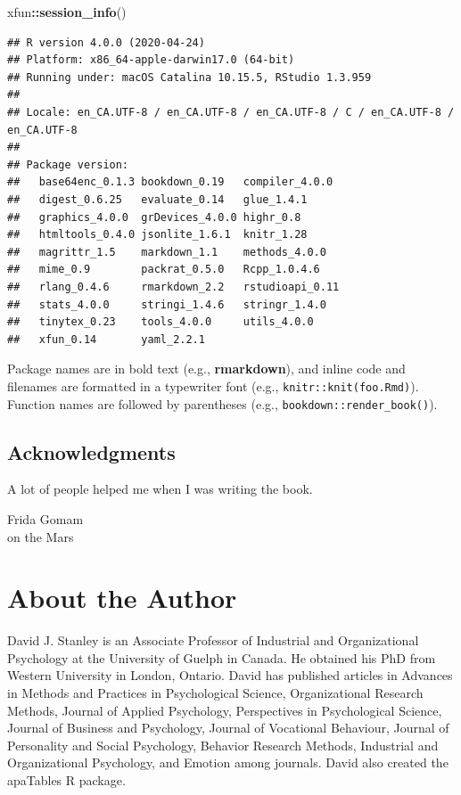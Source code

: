 \documentclass[
]{krantz}
\makeatletter
\newenvironment{Shaded}{\begin{snugshade}}{\end{snugshade}}
\newcommand{\KeywordTok}[1]{\textcolor[rgb]{0.27,0.27,0.27}{\textbf{#1}}}
\newcommand{\NormalTok}[1]{#1}
\newcommand{\OperatorTok}[1]{\textcolor[rgb]{0.43,0.43,0.43}{\textbf{#1}}}
\newenvironment{kframe}{%
\medskip{}
\setlength{\fboxsep}{.8em}
 \def\at@end@of@kframe{}%
 \ifinner\ifhmode%
  \def\at@end@of@kframe{\end{minipage}}%
  \begin{minipage}{\columnwidth}%
 \fi\fi%
 \def\FrameCommand##1{\hskip\@totalleftmargin \hskip-\fboxsep
 \colorbox{shadecolor}{##1}\hskip-\fboxsep
     \hskip-\linewidth \hskip-\@totalleftmargin \hskip\columnwidth}%
 \MakeFramed {\advance\hsize-\width
   \@totalleftmargin\z@ \linewidth\hsize
   \@setminipage}}%
 {\par\unskip\endMakeFramed%
 \at@end@of@kframe}
\renewenvironment{Shaded}{\begin{kframe}}{\end{kframe}}
\makeatother
\begin{document}
\begin{Shaded}
\begin{Highlighting}[]
\NormalTok{xfun}\OperatorTok{::}\KeywordTok{session_info}\NormalTok{()}
\end{Highlighting}
\end{Shaded}

\begin{verbatim}
## R version 4.0.0 (2020-04-24)
## Platform: x86_64-apple-darwin17.0 (64-bit)
## Running under: macOS Catalina 10.15.5, RStudio 1.3.959
## 
## Locale: en_CA.UTF-8 / en_CA.UTF-8 / en_CA.UTF-8 / C / en_CA.UTF-8 / en_CA.UTF-8
## 
## Package version:
##   base64enc_0.1.3 bookdown_0.19   compiler_4.0.0 
##   digest_0.6.25   evaluate_0.14   glue_1.4.1     
##   graphics_4.0.0  grDevices_4.0.0 highr_0.8      
##   htmltools_0.4.0 jsonlite_1.6.1  knitr_1.28     
##   magrittr_1.5    markdown_1.1    methods_4.0.0  
##   mime_0.9        packrat_0.5.0   Rcpp_1.0.4.6   
##   rlang_0.4.6     rmarkdown_2.2   rstudioapi_0.11
##   stats_4.0.0     stringi_1.4.6   stringr_1.4.0  
##   tinytex_0.23    tools_4.0.0     utils_4.0.0    
##   xfun_0.14       yaml_2.2.1
\end{verbatim}

Package names are in bold text (e.g., \textbf{rmarkdown}), and inline code and filenames are formatted in a typewriter font (e.g., \texttt{knitr::knit(\textquotesingle{}foo.Rmd\textquotesingle{})}). Function names are followed by parentheses (e.g., \texttt{bookdown::render\_book()}).

\hypertarget{acknowledgments}{%
\section*{Acknowledgments}\label{acknowledgments}}


A lot of people helped me when I was writing the book.

\begin{flushright}
Frida Gomam\\
on the Mars
\end{flushright}

\hypertarget{about-the-author}{%
\chapter*{About the Author}\label{about-the-author}}


David J. Stanley is an Associate Professor of Industrial and Organizational Psychology at the University of Guelph in Canada. He obtained his PhD from Western University in London, Ontario. David has published articles in Advances in Methods and Practices in Psychological Science, Organizational Research Methods, Journal of Applied Psychology, Perspectives in Psychological Science, Journal of Business and Psychology, Journal of Vocational Behaviour, Journal of Personality and Social Psychology, Behavior Research Methods, Industrial and Organizational Psychology, and Emotion among journals. David also created the apaTables R package.
\end{document}
